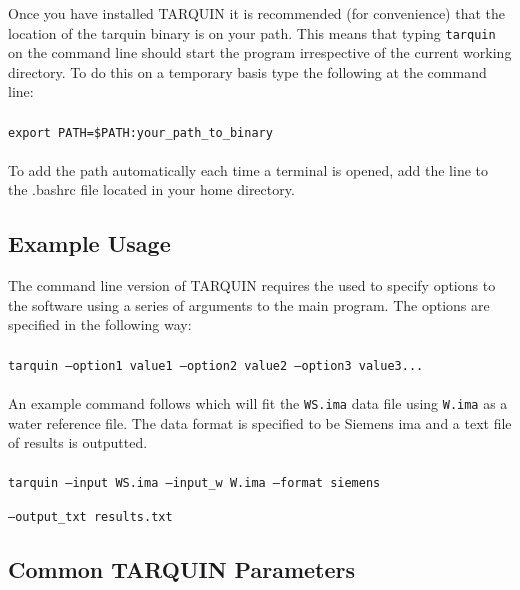 \documentclass[a4paper,12pt]{article}
\begin{document}
Once you have installed TARQUIN it is recommended (for convenience) that the location of the tarquin binary is on your path.  This means that typing \texttt{tarquin} on the command line should start the program irrespective of the current working directory.  To do this on a temporary basis type the following at the command line:
\\
\\
\texttt{export PATH=\$PATH:your\_path\_to\_binary}
\\
\\
To add the path automatically each time a terminal is opened, add the line to the .bashrc file located in your home directory.


\subsection{Example Usage}
The command line version of TARQUIN requires the used to specify options to the software using a series of arguments to the main program.  The options are specified in the following way:
\\
\\
\noindent
\texttt{tarquin ---option1 value1 ---option2 value2 ---option3 value3...}
\\
\\
An example command follows which will fit the \texttt{WS.ima} data file using \texttt{W.ima} as a water reference file.  The data format is specified to be Siemens ima and a text file of results is outputted.
\\
\\
\noindent
\texttt{tarquin ---input WS.ima ---input\_w W.ima ---format siemens}

\noindent
\texttt{---output\_txt results.txt}
\subsection{Common TARQUIN Parameters}
\end{document}
